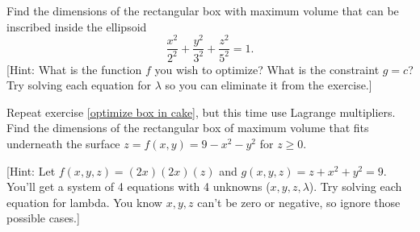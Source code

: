 
\begin{problem}
 Find the dimensions of the rectangular box with maximum volume that can be inscribed inside the ellipsoid $$\frac{x^2}{2^2}+\frac{y^2}{3^2}+\frac{z^2}{5^2}=1.$$
[Hint: What is the function $f$ you wish to optimize? What is the constraint $g=c$? Try solving each equation for $\lambda$ so you can eliminate it from the exercise.]
\end{problem}

\begin{problem}
Repeat exercise \ref{optimize box in cake}, but this time use Lagrange multipliers.
Find the dimensions of the rectangular box of maximum volume that fits underneath the surface $z=f(x,y)=9-x^2-y^2$ for $z\geq 0$. 

[Hint: Let $f(x,y,z) = (2x)(2x)(z)$ and $g(x,y,z)=z+x^2+y^2=9$. You'll get a system of 4 equations with 4 unknowns ($x,y,z,\lambda$).  Try solving each equation for lambda. You know $x,y,z$ can't be zero or negative, so ignore those possible cases.]
\end{problem}



\clearpage

